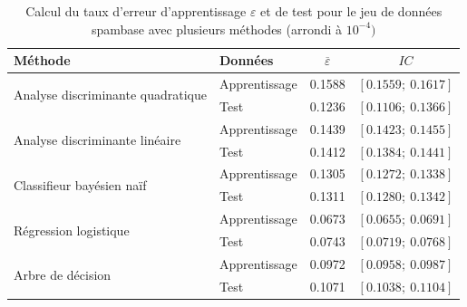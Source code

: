 \documentclass[a4paper,11pt,oneside,roman]{article}
\begin{document}
\begin{table}[H]
\centering

\begin{tabular}{l|l|cc}
\multicolumn{1}{l|}{\textbf{Méthode}}    & \textbf{Données} &$ \overline{\varepsilon}$ & $IC$                      \\ \hline
\multirow{2}{*}{Analyse discriminante quadratique} & Apprentissage    & 0.1588                   & $\left[0.1559 ;~ 0.1617 \right]$  \\
                                       & Test             &  0.1236             & $\left[0.1106  ;~ 0.1366 \right]$ \\ \hline
\multirow{2}{*}{Analyse discriminante linéaire}                  & Apprentissage & 0.1439                                 & $\left[0.1423 ;~ 0.1455 \right]$  \\
                                       & Test             & 0.1412                       & $\left[0.1384  ;~0.1441 \right]$ \\ \hline
\multirow{2}{*}{Classifieur bayésien naïf}                  & Apprentissage    &  0.1305                             & $\left[0.1272 ;~ 0.1338 \right]$  \\
                                       & Test             & 0.1311                                 & $\left[0.1280 ;~ 0.1342 \right]$ \\ \hline
\multirow{2}{*}{Régression logistique }                  & Apprentissage    &  0.0673                             & $\left[0.0655 ;~ 0.0691 \right]$  \\
                                       & Test             & 0.0743                                 & $\left[0.0719;~ 0.0768 \right]$ \\ \hline
\multirow{2}{*}{Arbre de décision}                  & Apprentissage    &  0.0972                             & $\left[0.0958 ;~  0.0987 \right]$  \\
                                       & Test             & 0.1071                                & $\left[0.1038 ;~ 0.1104 \right]$ 
\end{tabular}

\caption{Calcul du taux d'erreur d'apprentissage $\varepsilon$ et de test pour le jeu de données spambase avec plusieurs méthodes (arrondi à $10^{-4})$}
\label{spambase}
\end{table}
\end{document}
